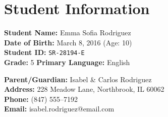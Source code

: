 \section{Student Information}

\begin{minipage}{0.48\textwidth}
\begin{iepbox}
{\bfseries\color{IEPNavy} Student Name:} Emma Sofia Rodriguez\\[2pt]
{\bfseries\color{IEPNavy} Date of Birth:} March 8, 2016 \hspace{1em} (Age: 10)\\[2pt]
{\bfseries\color{IEPNavy} Student ID:} \texttt{SR-28194-E}\\[2pt]
{\bfseries\color{IEPNavy} Grade:} 5\hspace{1em}
{\bfseries\color{IEPNavy} Primary Language:} English
\end{iepbox}
\end{minipage}%
\hfill
\begin{minipage}{0.48\textwidth}
\begin{iepbox}
{\bfseries\color{IEPNavy} Parent/Guardian:} Isabel \& Carlos Rodriguez\\[2pt]
{\bfseries\color{IEPNavy} Address:} 228 Meadow Lane, Northbrook, IL 60062\\[2pt]
{\bfseries\color{IEPNavy} Phone:} (847) 555--7192\\[2pt]
{\bfseries\color{IEPNavy} Email:} isabel.rodriguez@email.com
\end{iepbox}
\end{minipage}

\vspace{8pt}
